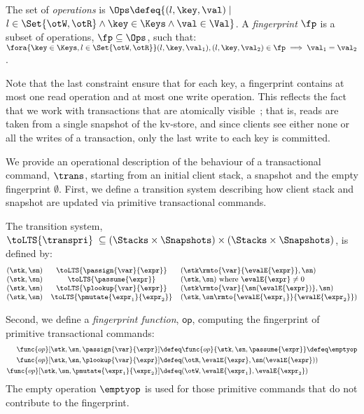 \begin{definition}[Fingerprints]
\label{beebop}
\label{def:fingerprint}
The set of \emph{operations} is 
$\Ops \defeq \{(l, \key, \val) \mid$ $ l \in \Set{\otW, \otR} \land \key \in \Keys \land \val \in \Val \}$.
A \emph{fingerprint} $\fp$ is a subset of operations, $\fp \subseteq \Ops$,
such that: 
$\fora{\key \in \Keys, l  \in \Set{\otW, \otR}}
	(l, \key, \val_1), (l, \key, \val_2) \in \fp \implies \val_1 = \val_2$.
\end{definition}
Note that the last constraint ensure that for each key, a fingerprint contains at most one read operation and at most one write operation.
This reflects the fact that we work with transactions that are
atomically visible~\cite{laws}; 
that is, reads are taken from a single snapshot of the kv-store, 
and since clients see either none or all the writes of a transaction, only the last write to each key is 
committed.

We provide an operational description of the behaviour of a transactional command, $\trans$,
starting from an initial client stack, a snapshot and the empty fingerprint $\emptyset$. 
First, we define a transition system describing how client stack and snapshot are updated via
primitive transactional commands.


\begin{definition}
\label{def:primitive_semantics}
The transition system, $\toLTS{\transpri}\; \subseteq (\Stacks \times \Snapshots) \times (\Stacks \times \Snapshots)$, 
is defined by:
%
{%
\[
\small
\begin{array}{@{} r c l @{}}
(\stk, \sn)  & \toLTS{\passign{\var}{\expr}}          & (\stk\rmto{\var}{\evalE{\expr}}, \sn)                  \\
(\stk, \sn)  & \toLTS{\passume{\expr}}                & (\stk, \sn) \text{ where } \evalE{\expr} \neq 0        \\
(\stk, \sn)  
& \toLTS{ \plookup{\var}{\expr} } 
& (\stk\rmto{\var}{\sn(\evalE{\expr})}, \sn) 
\\
(\stk, \sn)
& \toLTS{\pmutate{\expr_{1}}{\expr_{2}}  }
& (\stk, \sn\rmto{\evalE{\expr_{1}}}{\evalE{\expr_{2}}}) \\
\end{array}
\]%
}%
%
\end{definition}
\noindent Second, we define a \emph{fingerprint function}, $\mathsf{op}$, computing the fingerprint of primitive transactional commands:
\[
\small
\begin{aligned}
\func{op}[\stk, \sn, \passign{\var}{\expr}]           & \defeq \func{op}{\stk, \sn, \passume{\expr}} \defeq \emptyop \\
\func{op}[\stk, \sn,  \plookup{\var}{\expr}]          & \defeq (\otR, \evalE{\expr}, \sn(\evalE{\expr})) \\
\func{op}[\stk,  \sn, \pmutate{\expr_{1}}{\expr_{2}}] & \defeq (\otW, \evalE{\expr_{1}}, \evalE{\expr_{2}})
\end{aligned}
\]
The  empty operation $\emptyop$ is used for those primitive commands that do not
contribute to the fingerprint.


